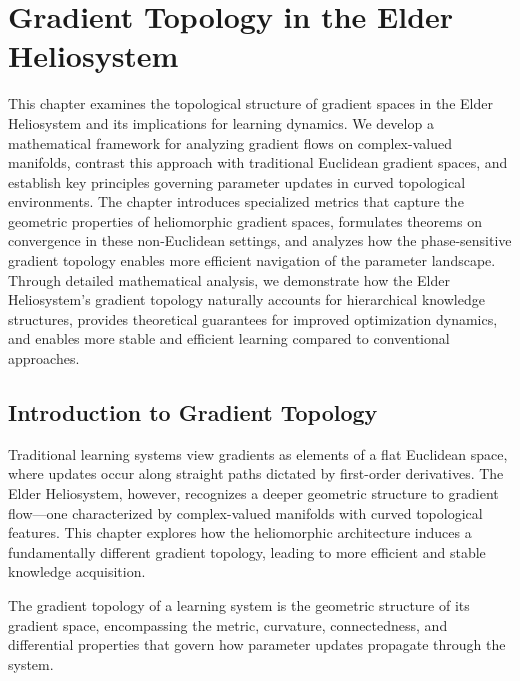 \chapter{Gradient Topology in the Elder Heliosystem}

\begin{tcolorbox}[colback=DarkSkyBlue!5!white,colframe=DarkSkyBlue!75!black,title=Chapter Summary]
This chapter examines the topological structure of gradient spaces in the Elder Heliosystem and its implications for learning dynamics. We develop a mathematical framework for analyzing gradient flows on complex-valued manifolds, contrast this approach with traditional Euclidean gradient spaces, and establish key principles governing parameter updates in curved topological environments. The chapter introduces specialized metrics that capture the geometric properties of heliomorphic gradient spaces, formulates theorems on convergence in these non-Euclidean settings, and analyzes how the phase-sensitive gradient topology enables more efficient navigation of the parameter landscape. Through detailed mathematical analysis, we demonstrate how the Elder Heliosystem's gradient topology naturally accounts for hierarchical knowledge structures, provides theoretical guarantees for improved optimization dynamics, and enables more stable and efficient learning compared to conventional approaches.
\end{tcolorbox}

\section{Introduction to Gradient Topology}

Traditional learning systems view gradients as elements of a flat Euclidean space, where updates occur along straight paths dictated by first-order derivatives. The Elder Heliosystem, however, recognizes a deeper geometric structure to gradient flow—one characterized by complex-valued manifolds with curved topological features. This chapter explores how the heliomorphic architecture induces a fundamentally different gradient topology, leading to more efficient and stable knowledge acquisition.

\begin{definition}
The gradient topology of a learning system is the geometric structure of its gradient space, encompassing the metric, curvature, connectedness, and differential properties that govern how parameter updates propagate through the system.
\end{definition}

